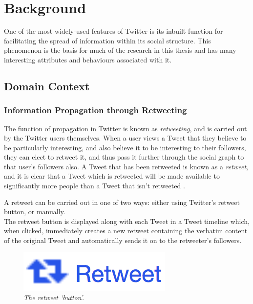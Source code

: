 \chapter{Background}


One of the most widely-used features of Twitter is its inbuilt function for facilitating the spread of information within its social structure. This phenomenon is the basis for much of the research in this thesis and has many interesting attributes and behaviours associated with it.


\section{Domain Context}

\subsection{Information Propagation through Retweeting}
The function of propagation in Twitter is known as \textit{retweeting}, and is carried out by the Twitter users themselves. When a user views a Tweet that they believe to be particularly interesting, and also believe it to be interesting to their followers, they can elect to retweet it, and thus pass it further through the social graph to that user's followers also. A Tweet that has been retweeted is known as a \textit{retweet}, and it is clear that a Tweet which is retweeted will be made available to significantly more people than a Tweet that isn't retweeted \cite{webberley11} \cite{kwak10}.

A retweet can be carried out in one of two ways: either using Twitter's retweet button, or manually. \\
The retweet button is displayed along with each Tweet in a Tweet timeline which, when clicked, immediately creates a new retweet containing the verbatim content of the original Tweet and automatically sends it on to the retweeter's followers.\\

\begin{figure}[h]
\centering
\includegraphics[scale=0.3]{2.Background/Media/retweet_button.png} 
\caption{\textit{The retweet `button'.}}
\label{fig:retweet_button}
\end{figure}

